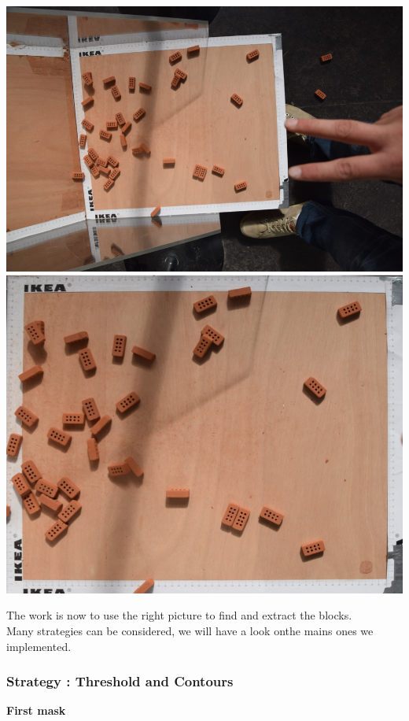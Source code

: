 \documentclass{article}
\begin{document}
\begin{center}
    \includegraphics[scale=0.4]{images/result_1.png}  
    \includegraphics[scale=0.4]{images/resul_1.png}      
\end{center}

The work is now to use the right picture to find and extract the blocks.\\
Many strategies can be considered, we will have a look onthe mains ones we implemented.

\subsubsection{Strategy : Threshold and Contours}

\textbf{First mask}
\end{document}

